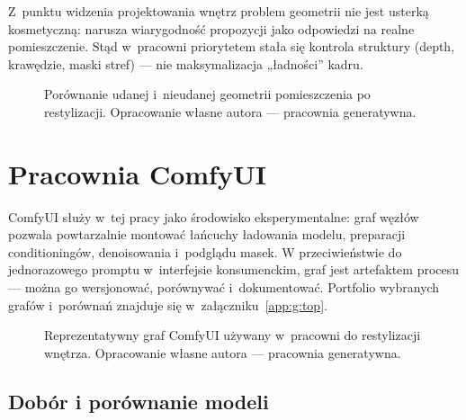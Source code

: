 Z~punktu widzenia projektowania wnętrz problem geometrii nie jest usterką kosmetyczną: narusza wiarygodność propozycji jako odpowiedzi na realne pomieszczenie. Stąd w~pracowni priorytetem stała się kontrola struktury (depth, krawędzie, maski stref) --- nie maksymalizacja „ładności” kadru.

\begin{figure}[htbp]
  \centering
  \caption{Porównanie udanej i~nieudanej geometrii pomieszczenia po restylizacji.
  Opracowanie własne autora --- pracownia generatywna.}
  \label{fig:ch04:geometry}
\end{figure}

\section{Pracownia ComfyUI}
\label{ch04:sec:comfyui}

ComfyUI służy w~tej pracy jako środowisko eksperymentalne: graf węzłów pozwala powtarzalnie montować łańcuchy ładowania modelu, preparacji conditioningów, denoisowania i~podglądu masek. W przeciwieństwie do jednorazowego promptu w~interfejsie konsumenckim, graf jest artefaktem procesu --- można go wersjonować, porównywać i~dokumentować. Portfolio wybranych grafów i~porównań znajduje się w~załączniku~\ref{app:g:top}.

\begin{figure}[htbp]
  \centering
  \caption{Reprezentatywny graf ComfyUI używany w~pracowni do restylizacji wnętrza.
  Opracowanie własne autora --- pracownia generatywna.}
  \label{fig:ch04:comfyui-graph}
\end{figure}

\subsection{Dobór i porównanie modeli}
\label{ch04:sec:modele}

